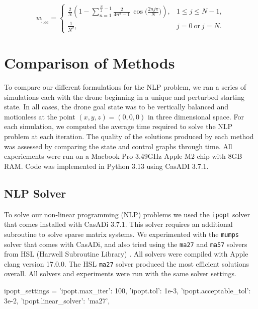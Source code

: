 \documentclass[]{article}
\begin{document}
	\[
        w_{\mathrm{j_{odd}}} =
        \begin{cases}
        \displaystyle
        \frac{2}{N}\!\left(
        1 - \sum_{n=1}^{\frac{N}{2}-1} \frac{2}{4n^{2}-1}\,
        \cos\!\Big(\tfrac{2 n j \pi}{N}\Big)
        \right), & 1 \le j \le N-1, \\[2ex]
        \displaystyle \frac{1}{N^{2}}, & j=0\ \text{or}\ j=N.
        \end{cases}
        \]

\section*{Comparison of Methods}

To compare our different formulations for the NLP problem, we ran a series of simulations each with the drone beginning in a unique and perturbed starting state. In all cases, the drone goal state was to be vertically balanced and motionless at the point $(x,y,z) = (0, 0, 0)$ in three dimensional space. For each simulation, we computed the average time required to solve the NLP problem at each iteration. The quality of the solutions produced by each method was assessed by comparing the state and control graphs through time. All experiements were run on a Macbook Pro  3.49GHz Apple M2 chip with 8GB RAM. Code was implemented in Python 3.13 using CasADI 3.7.1. 
	
	\subsection*{NLP Solver}
	To solve our non-linear programming (NLP) problems we used the \texttt{ipopt} solver that comes installed with CasADi 3.7.1.  This solver requires an additional subroutine to  solve sparse matrix systems. We experimented with the \texttt{mumps}  solver that comes with CasADi, and also tried using the  \texttt{ma27} and  \texttt{ma57} solvers  from HSL (Harwell Subroutine Library) \cite{hsl}. All solvers were compiled with Apple clang version 17.0.0. The HSL \texttt{ma27} solver produced the most efficient solutions overall. All solvers and experiments were run with the same solver settings.
	\vspace{\baselineskip}
	\begin{python}
        ipopt_settings = {
			'ipopt.max_iter': 100,                  
			'ipopt.tol': 1e-3,                      	
			'ipopt.acceptable_tol': 3e-2,
			'ipopt.linear_solver': 'ma27',
		}
	\end{python}
\end{document}
